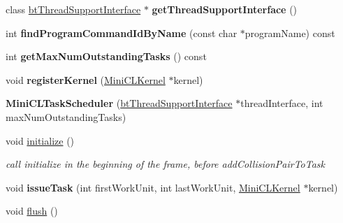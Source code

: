 \begin{DoxyCompactItemize}
\mbox{\label{classMiniCLTaskScheduler_a9576eb22445a68bc9cf1ca0501b974f0}} 
class \hyperlink{classbtThreadSupportInterface}{bt\+Thread\+Support\+Interface} $\ast$ {\bfseries get\+Thread\+Support\+Interface} ()
\item 
\mbox{\label{classMiniCLTaskScheduler_ad93828a3a1474e5ef5673888d58a46bc}} 
int {\bfseries find\+Program\+Command\+Id\+By\+Name} (const char $\ast$program\+Name) const
\item 
\mbox{\label{classMiniCLTaskScheduler_a341dbc22d09e4e2622080aa653defdf1}} 
int {\bfseries get\+Max\+Num\+Outstanding\+Tasks} () const
\item 
\mbox{\label{classMiniCLTaskScheduler_aeba8cfc17be247623d84e56f735baf0c}} 
void {\bfseries register\+Kernel} (\hyperlink{structMiniCLKernel}{Mini\+C\+L\+Kernel} $\ast$kernel)
\item 
\mbox{\label{classMiniCLTaskScheduler_a3fd2147fd33425ec936e49a898a4f6d0}} 
{\bfseries Mini\+C\+L\+Task\+Scheduler} (\hyperlink{classbtThreadSupportInterface}{bt\+Thread\+Support\+Interface} $\ast$thread\+Interface, int max\+Num\+Outstanding\+Tasks)
\item 
\mbox{\label{classMiniCLTaskScheduler_ae3dbcee1e36753aac47327d035560f10}} 
void \hyperlink{classMiniCLTaskScheduler_ae3dbcee1e36753aac47327d035560f10}{initialize} ()
\begin{DoxyCompactList}\small\item\em call initialize in the beginning of the frame, before add\+Collision\+Pair\+To\+Task \end{DoxyCompactList}\item 
\mbox{\label{classMiniCLTaskScheduler_accd5680fa809616919d83df8e959cb90}} 
void {\bfseries issue\+Task} (int first\+Work\+Unit, int last\+Work\+Unit, \hyperlink{structMiniCLKernel}{Mini\+C\+L\+Kernel} $\ast$kernel)
\item 
\mbox{\label{classMiniCLTaskScheduler_aaaaefcab8688c6c73792b9786f700873}} 
void \hyperlink{classMiniCLTaskScheduler_aaaaefcab8688c6c73792b9786f700873}{flush} ()

\end{DoxyCompactItemize}
